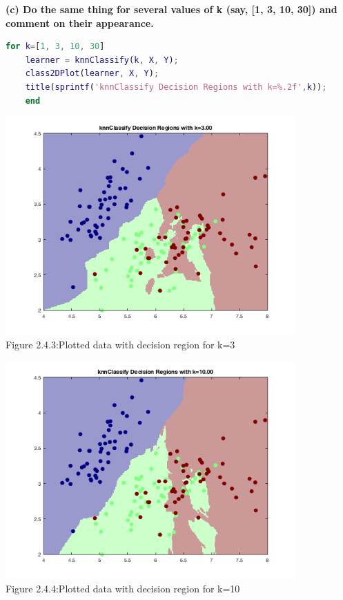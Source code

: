 \documentclass[]{scrreprt}   %
\begin{document}
\textbf{(c) Do the same thing for several values of k (say, [1, 3, 10, 30]) and comment on their appearance.}
\begin{lstlisting}[language=Matlab]
	for k=[1, 3, 10, 30]
	learner = knnClassify(k, X, Y);
	class2DPlot(learner, X, Y);
	title(sprintf('knnClassify Decision Regions with k=%.2f',k));
	end
\end{lstlisting}
\begin{center}
	\includegraphics[width=30em,keepaspectratio]{p4figure3.png}\\
	{Figure 2.4.3:Plotted data with decision region for k=3}
\end{center} 
\begin{center}
\includegraphics[width=30em,keepaspectratio]{p4figure4.png}\\
{Figure 2.4.4:Plotted data with decision region for k=10}
\end{center} 
\end{document}
